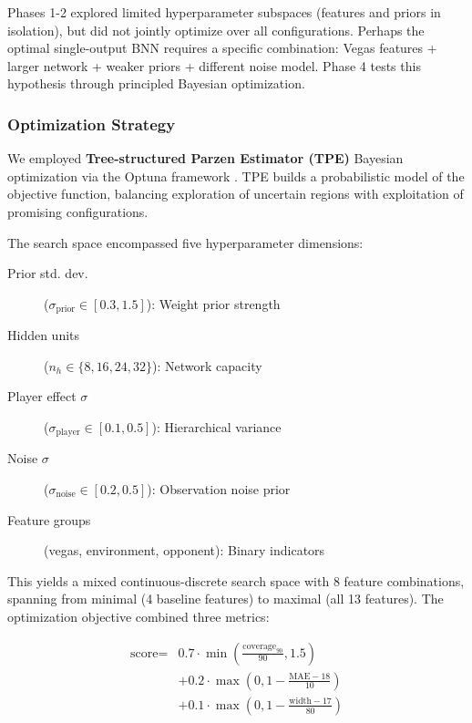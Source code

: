 Phases 1-2 explored limited hyperparameter subspaces (features and priors in isolation), but did not jointly optimize over all configurations. Perhaps the optimal single-output BNN requires a specific combination: Vegas features + larger network + weaker priors + different noise model. Phase 4 tests this hypothesis through principled Bayesian optimization.

\subsubsection{Optimization Strategy}

We employed \textbf{Tree-structured Parzen Estimator (TPE)} Bayesian optimization via the Optuna framework \citep{akiba2019optuna}. TPE builds a probabilistic model of the objective function, balancing exploration of uncertain regions with exploitation of promising configurations.

The search space encompassed five hyperparameter dimensions:

\begin{description}
    \item[Prior std. dev.] ($\sigma_{\text{prior}} \in [0.3, 1.5]$): Weight prior strength
    \item[Hidden units] ($n_h \in \{8, 16, 24, 32\}$): Network capacity
    \item[Player effect $\sigma$] ($\sigma_{\text{player}} \in [0.1, 0.5]$): Hierarchical variance
    \item[Noise $\sigma$] ($\sigma_{\text{noise}} \in [0.2, 0.5]$): Observation noise prior
    \item[Feature groups] (vegas, environment, opponent): Binary indicators
\end{description}

This yields a mixed continuous-discrete search space with 8 feature combinations, spanning from minimal (4 baseline features) to maximal (all 13 features). The optimization objective combined three metrics:

\begin{equation}
\begin{split}
    \text{score} = & 0.7 \cdot \min\left(\frac{\text{coverage}_{90}}{90}, 1.5\right) \\
    & + 0.2 \cdot \max\left(0, 1 - \frac{\text{MAE} - 18}{10}\right) \\
    & + 0.1 \cdot \max\left(0, 1 - \frac{\text{width} - 17}{80}\right)
\end{split}
\end{equation}

